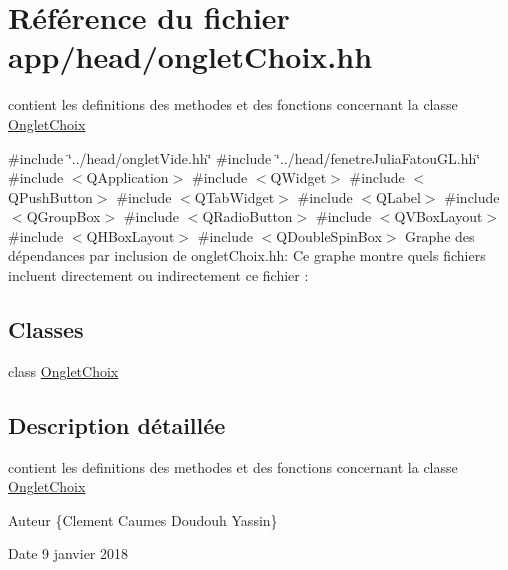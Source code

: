 \hypertarget{ongletChoix_8hh}{}\section{Référence du fichier app/head/onglet\+Choix.hh}
\label{ongletChoix_8hh}


contient les definitions des methodes et des fonctions concernant la classe \hyperlink{classOngletChoix}{Onglet\+Choix}  


{\ttfamily \#include \char`\"{}../head/onglet\+Vide.\+hh\char`\"{}}\newline
{\ttfamily \#include \char`\"{}../head/fenetre\+Julia\+Fatou\+G\+L.\+hh\char`\"{}}\newline
{\ttfamily \#include $<$Q\+Application$>$}\newline
{\ttfamily \#include $<$Q\+Widget$>$}\newline
{\ttfamily \#include $<$Q\+Push\+Button$>$}\newline
{\ttfamily \#include $<$Q\+Tab\+Widget$>$}\newline
{\ttfamily \#include $<$Q\+Label$>$}\newline
{\ttfamily \#include $<$Q\+Group\+Box$>$}\newline
{\ttfamily \#include $<$Q\+Radio\+Button$>$}\newline
{\ttfamily \#include $<$Q\+V\+Box\+Layout$>$}\newline
{\ttfamily \#include $<$Q\+H\+Box\+Layout$>$}\newline
{\ttfamily \#include $<$Q\+Double\+Spin\+Box$>$}\newline
Graphe des dépendances par inclusion de onglet\+Choix.\+hh\+:
Ce graphe montre quels fichiers incluent directement ou indirectement ce fichier \+:
\subsection*{Classes}
\begin{DoxyCompactItemize}
\item 
class \hyperlink{classOngletChoix}{Onglet\+Choix}
\end{DoxyCompactItemize}


\subsection{Description détaillée}
contient les definitions des methodes et des fonctions concernant la classe \hyperlink{classOngletChoix}{Onglet\+Choix} 

\begin{DoxyAuthor}{Auteur}
\{Clement Caumes Doudouh Yassin\} 
\end{DoxyAuthor}
\begin{DoxyDate}{Date}
9 janvier 2018 
\end{DoxyDate}
